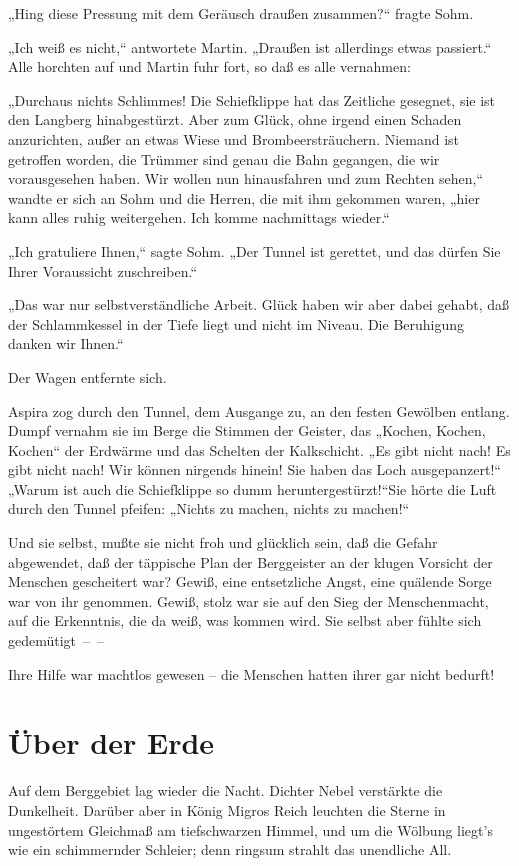 „Hing diese Pressung mit dem Geräusch draußen zusammen?“ fragte
Sohm.

„Ich weiß es nicht,“ antwortete Martin. „Draußen ist allerdings
etwas passiert.“ Alle horchten auf und Martin fuhr fort, so daß es
alle vernahmen:

„Durchaus nichts Schlimmes! Die Schiefklippe hat das Zeitliche
gesegnet, sie ist den Langberg hinabgestürzt. Aber zum Glück, ohne
irgend einen Schaden anzurichten, außer an etwas Wiese und
Brombeersträuchern. Niemand ist getroffen worden, die Trümmer sind
genau die Bahn gegangen, die wir vorausgesehen haben. Wir wollen
nun hinausfahren und zum Rechten sehen,“ wandte er sich an Sohm und
die Herren, die mit ihm gekommen waren, „hier kann alles ruhig
weitergehen. Ich komme nachmittags wieder.“

„Ich gratuliere Ihnen,“ sagte Sohm. „Der Tunnel ist gerettet, und
das dürfen Sie Ihrer Voraussicht zuschreiben.“

„Das war nur selbstverständliche Arbeit. Glück haben wir aber dabei
gehabt, daß der Schlammkessel in der Tiefe liegt und nicht im
Niveau. Die Beruhigung danken wir Ihnen.“

Der Wagen entfernte sich.

Aspira zog durch den Tunnel, dem Ausgange zu, an den festen
Gewölben entlang. Dumpf vernahm sie im Berge die Stimmen der
Geister, das „Kochen, Kochen, Kochen“ der Erdwärme und das Schelten
der Kalkschicht. „Es gibt nicht nach! Es gibt nicht nach! Wir
können nirgends hinein! Sie haben das Loch ausgepanzert!“~ „Warum
ist auch die Schiefklippe so dumm heruntergestürzt!“Sie hörte die
Luft durch den Tunnel pfeifen: „Nichts zu machen, nichts zu
machen!“

Und sie selbst, mußte sie nicht froh und glücklich sein, daß die
Gefahr abgewendet, daß der täppische Plan der Berggeister an der
klugen Vorsicht der Menschen gescheitert war? Gewiß, eine
entsetzliche Angst, eine quälende Sorge war von ihr genommen.
Gewiß, stolz war sie auf den Sieg der Menschenmacht, auf die
Erkenntnis, die da weiß, was kommen wird. Sie selbst aber fühlte
sich gedemütigt~–~–

Ihre Hilfe war machtlos gewesen – die Menschen hatten ihrer gar
nicht bedurft!

\section{Über der Erde}

Auf dem Berggebiet lag wieder die Nacht. Dichter Nebel verstärkte
die Dunkelheit. Darüber aber in König Migros Reich leuchten die
Sterne in ungestörtem Gleichmaß am tiefschwarzen Himmel, und um die
Wölbung liegt's wie ein schimmernder Schleier; denn ringsum strahlt
das unendliche All.

